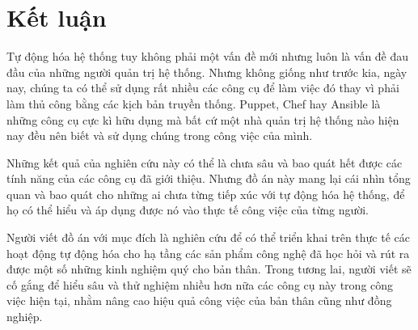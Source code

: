 \chapter*{Kết luận}

Tự động hóa hệ thống tuy không phải một vấn đề mới nhưng luôn là vấn đề đau đầu của những người quản trị hệ thống. Nhưng không giống như trước kia, ngày nay, chúng ta có thể sử dụng rất nhiều các công cụ để làm việc đó thay vì phải làm thủ công bằng các kịch bản truyền thống. Puppet, Chef hay Ansible là những công cụ cực kì hữu dụng mà bất cứ một nhà quản trị hệ thống nào hiện nay đều nên biết và sử dụng chúng trong công việc của mình.

Những kết quả của nghiên cứu này có thể là chưa sâu và bao quát hết được các tính năng của các công cụ đã giới thiệu. Nhưng đồ án này mang lại cái nhìn tổng quan và bao quát cho những ai chưa từng tiếp xúc với tự động hóa hệ thống, để họ có thể hiểu và áp dụng được nó vào thực tế công việc của từng người.

Người viết đồ án với mục đích là nghiên cứu để có thể triển khai trên thực tế các hoạt động tự động hóa cho hạ tầng các sản phẩm công nghệ đã học hỏi và rút ra được một số những kinh nghiệm quý cho bản thân. Trong tương lai, người viết sẽ cố gắng để hiểu sâu và thử nghiệm nhiều hơn nữa các công cụ này trong công việc hiện tại, nhằm nâng cao hiệu quả công việc của bản thân cũng như đồng nghiệp.

